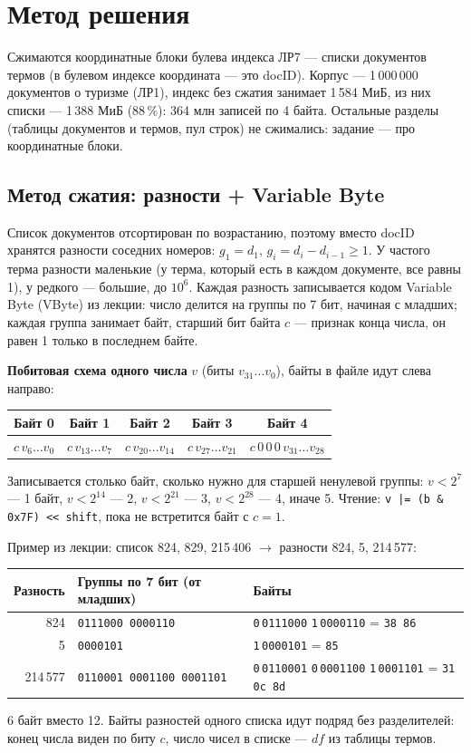 \pagebreak
\section{Метод решения}
Сжимаются координатные блоки булева индекса ЛР7 --- списки документов термов (в булевом индексе координата --- это docID). Корпус --- 1\,000\,000 документов о туризме (ЛР1), индекс без сжатия занимает 1\,584 МиБ, из них списки --- 1\,388 МиБ (88\,\%): 364 млн записей по 4 байта. Остальные разделы (таблицы документов и термов, пул строк) не сжимались: задание --- про координатные блоки.

\subsection{Метод сжатия: разности + Variable Byte}
Список документов отсортирован по возрастанию, поэтому вместо docID хранятся разности соседних номеров: $g_1 = d_1$, $g_i = d_i - d_{i-1} \ge 1$. У частого терма разности маленькие (у терма, который есть в каждом документе, все равны 1), у редкого --- большие, до $10^6$. Каждая разность записывается кодом Variable Byte (VByte) из лекции: число делится на группы по 7 бит, начиная с младших; каждая группа занимает байт, старший бит байта $c$ --- признак конца числа, он равен 1 только в последнем байте.

\textbf{Побитовая схема одного числа} $v$ (биты $v_{31} \dots v_0$), байты в файле идут слева направо:
\begin{center}
\small
\begin{tabular}{|c|c|c|c|c|}
\hline
Байт 0 & Байт 1 & Байт 2 & Байт 3 & Байт 4 \\
\hline
$c\,v_6 \dots v_0$ & $c\,v_{13} \dots v_7$ & $c\,v_{20} \dots v_{14}$ & $c\,v_{27} \dots v_{21}$ & $c\,0\,0\,0\,v_{31} \dots v_{28}$ \\
\hline
\end{tabular}
\end{center}
Записывается столько байт, сколько нужно для старшей ненулевой группы: $v < 2^7$ --- 1 байт, $v < 2^{14}$ --- 2, $v < 2^{21}$ --- 3, $v < 2^{28}$ --- 4, иначе 5. Чтение: \texttt{v |= (b \& 0x7F) <{}< shift}, пока не встретится байт с $c = 1$.

Пример из лекции: список 824, 829, 215\,406 $\to$ разности 824, 5, 214\,577:
\begin{center}
\small
\begin{tabular}{|r|l|l|}
\hline
Разность & Группы по 7 бит (от младших) & Байты \\
\hline
824 & \texttt{0111000 0000110} & \texttt{0}\,\texttt{0111000} \texttt{1}\,\texttt{0000110} = \texttt{38 86} \\
5 & \texttt{0000101} & \texttt{1}\,\texttt{0000101} = \texttt{85} \\
214\,577 & \texttt{0110001 0001100 0001101} & \texttt{0}\,\texttt{0110001} \texttt{0}\,\texttt{0001100} \texttt{1}\,\texttt{0001101} = \texttt{31 0c 8d} \\
\hline
\end{tabular}
\end{center}
6 байт вместо 12. Байты разностей одного списка идут подряд без разделителей: конец числа виден по биту $c$, число чисел в списке --- $df$ из таблицы термов.

